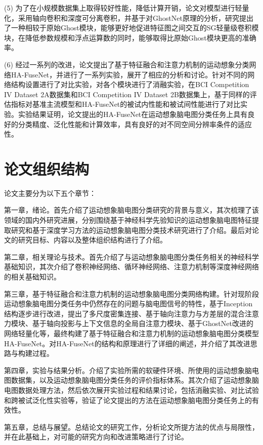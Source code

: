 (5) 为了在小规模数据集上取得较好性能，降低计算开销，论文对模型进行轻量化，采用轴向卷积和深度可分离卷积，并基于对GhostNet原理的分析，研究提出了一种相较于原始Ghost模块，能够更好地促进特征图之间交互的SG轻量级卷积模块，在降低参数规模和浮点运算数的同时，能够取得比原始Ghost模块更高的准确率。

(6) 经过一系列的改进，论文提出了基于特征融合和注意力机制的运动想象分类网络HA-FuseNet，并进行了一系列实验，展开了相应的分析和讨论。针对不同的网络结构设置进行了对比实验，对各个模块进行了消融实验，在BCI Competition IV Dataset 2A数据集和BCI Competition IV Dataset 2B数据集上，基于同样的评估指标对基准主流模型和HA-FuseNet的被试内性能和被试间性能进行了对比实验。实验结果证明，论文提出的HA-FuseNet在运动想象脑电图分类任务上具有良好的分类精度、泛化性能和计算效率，具有良好的对不同空间分辨率条件的适应性。

\section{论文组织结构}

论文主要分为以下五个章节：

第一章，绪论。首先介绍了运动想象脑电图分类研究的背景与意义，其次梳理了该领域的国内外研究进展，分别围绕基于神经科学先验知识的运动想象脑电图特征提取研究和基于深度学习方法的运动想象脑电图分类技术研究进行了介绍。最后对论文的研究目标、内容以及整体组织结构进行了介绍。

第二章，相关理论与技术。首先介绍了与运动想象脑电图分类任务相关的神经科学基础知识，其次介绍了卷积神经网络、循环神经网络、注意力机制等深度神经网络的相关基础知识。

第三章，基于特征融合和注意力机制的运动想象脑电图分类网络构建。针对现阶段运动想象脑电图分类任务中仍然存在的问题与脑电图信号的特性，基于Inception结构逐步进行改进，提出了多尺度密集连接、基于轴向注意力与方差层的混合注意力模块、基于轴向投影与上下文信息的全局自注意力模块、基于GhostNet改进的网络轻量化等，最终构建了基于特征融合和注意力机制的运动想象脑电图分类模型HA-FuseNet。对HA-FuseNet的结构和原理进行了详细的阐述，并介绍了其改进思路与构建过程。

第四章，实验与结果分析。介绍了实验所需的软硬件环境、所使用的运动想象脑电图数据集，以及运动想象脑电图分类任务的评价指标体系。其次介绍了运动想象脑电图数据处理方法，然后依次展开实验过程和结果讨论，包括消融实验、对比试验和跨被试泛化性实验等，验证了论文提出的方法在运动想象脑电图分类任务上的有效性。

第五章，总结与展望。总结论文的研究工作，分析论文所提方法的优点与局限性，并在此基础上，对可能的研究方向和改进策略进行了讨论。